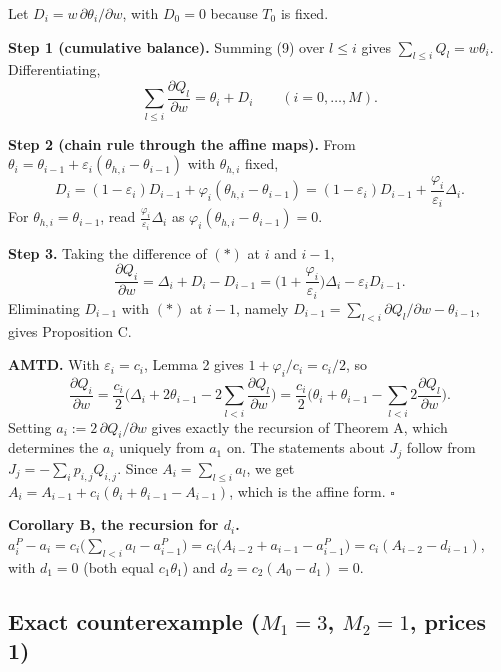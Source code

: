 \documentclass[11pt,a4paper]{report}
\begin{document}
Let \(D_i = w\,\partial\theta_i/\partial w\), with \(D_0 = 0\) because \(T_0\) is fixed.

\textbf{Step 1 (cumulative balance).} Summing (9) over \(l \le i\) gives \(\sum_{l\le i} Q_l = w\theta_i\).
Differentiating,
\[\sum_{l \le i} \frac{\partial Q_l}{\partial w} = \theta_i + D_i \qquad (i = 0,\dots,M). \tag{$*$}\]

\textbf{Step 2 (chain rule through the affine maps).} From
\(\theta_i = \theta_{i-1} + \varepsilon_i(\theta_{h,i} - \theta_{i-1})\) with \(\theta_{h,i}\) fixed,
\[D_i = (1-\varepsilon_i)D_{i-1} + \varphi_i(\theta_{h,i} - \theta_{i-1}) = (1-\varepsilon_i)D_{i-1} + \frac{\varphi_i}{\varepsilon_i}\Delta_i .\]
For \(\theta_{h,i} = \theta_{i-1}\), read \(\frac{\varphi_i}{\varepsilon_i}\Delta_i\) as
\(\varphi_i(\theta_{h,i}-\theta_{i-1}) = 0\).

\textbf{Step 3.} Taking the difference of \((*)\) at \(i\) and \(i-1\),
\[\frac{\partial Q_i}{\partial w} = \Delta_i + D_i - D_{i-1} = \Big(1 + \frac{\varphi_i}{\varepsilon_i}\Big)\Delta_i - \varepsilon_i D_{i-1}.\]
Eliminating \(D_{i-1}\) with \((*)\) at \(i-1\), namely \(D_{i-1} = \sum_{l<i}\partial Q_l/\partial w - \theta_{i-1}\),
gives Proposition C.

\textbf{AMTD.} With \(\varepsilon_i = c_i\), Lemma 2 gives \(1 + \varphi_i/c_i = c_i/2\), so
\[\frac{\partial Q_i}{\partial w} = \frac{c_i}{2}\Big(\Delta_i + 2\theta_{i-1} - 2\sum_{l<i}\frac{\partial Q_l}{\partial w}\Big)
   = \frac{c_i}{2}\Big(\theta_i + \theta_{i-1} - \sum_{l<i} 2\frac{\partial Q_l}{\partial w}\Big).\]
Setting \(a_i := 2\,\partial Q_i/\partial w\) gives exactly the recursion of Theorem A, which determines the \(a_i\)
uniquely from \(a_1\) on. The statements about \(J_j\) follow from \(J_j = -\sum_i p_{i,j} Q_{i,j}\). Since
\(A_i = \sum_{l\le i} a_l\), we get \(A_i = A_{i-1} + c_i(\theta_i + \theta_{i-1} - A_{i-1})\), which is the affine form.
\(\square\)

\textbf{Corollary B, the recursion for \(d_i\).}
\(a^P_i - a_i = c_i\big(\sum_{l<i} a_l - a^P_{i-1}\big) = c_i\big(A_{i-2} + a_{i-1} - a^P_{i-1}\big) = c_i(A_{i-2} - d_{i-1})\),
with \(d_1 = 0\) (both equal \(c_1\theta_1\)) and \(d_2 = c_2(A_0 - d_1) = 0\).

\subsection{\texorpdfstring{Exact counterexample (\(M_1 = 3\), \(M_2 = 1\), prices 1)}{Exact counterexample (M1 = 3, M2 = 1, prices 1)}}\label{sec:cex}
\end{document}
